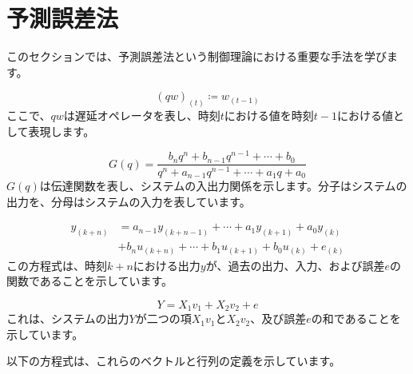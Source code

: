 \documentclass[a4paper,twocolumn]{jarticle}
\begin{document}
\section*{予測誤差法}

このセクションでは、予測誤差法という制御理論における重要な手法を学びます。

\[
  (qw)_{(t)}\coloneqq w_{(t-1)}
\]
ここで、\( qw \)は遅延オペレータを表し、時刻\( t \)における値を時刻\( t-1 \)における値として表現します。

\[
  G(q)=\frac{b_nq^n+b_{n-1}q^{n-1}+\cdots+b_0}{q^n+a_{n-1}q^{n-1}+\cdots+a_1q+a_0}
\]
\( G(q) \)は伝達関数を表し、システムの入出力関係を示します。分子はシステムの出力を、分母はシステムの入力を表しています。

\begin{align*}
  y_{(k+n)}&=a_{n-1}y_{(k+n-1)}+\cdots+a_1y_{(k+1)}+a_0y_{(k)}\\
  &+b_nu_{(k+n)}+\cdots+b_1u_{(k+1)}+b_0u_{(k)}+e_{(k)}
\end{align*}
この方程式は、時刻\( k+n \)における出力\( y \)が、過去の出力、入力、および誤差\( e \)の関数であることを示しています。

\[
  Y=X_1v_1+X_2v_2+e
\]
これは、システムの出力\( Y \)が二つの項\( X_1v_1 \)と\( X_2v_2 \)、及び誤差\( e \)の和であることを示しています。

以下の方程式は、これらのベクトルと行列の定義を示しています。
\end{document}
